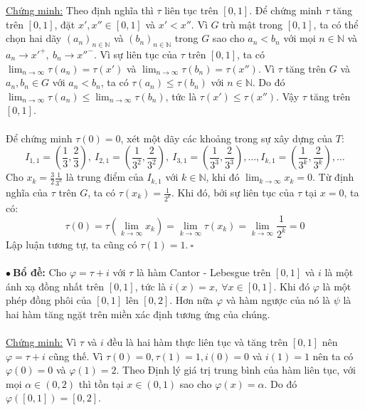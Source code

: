 \documentclass[10.5pt, a4paper]{article}
\begin{document}
\underline{Chứng minh:} Theo định nghĩa thì $\tau$ liên tục trên $[0,1]$. Để chứng minh $\tau$ tăng trên $[0,1]$, đặt $x',x''\in[0,1]$ và $x'<x''$. Vì $G$ trù mật trong $[0,1]$, ta có thể chọn hai dãy $(a_n)_{n\in\mathbb N}$ và $(b_n)_{n\in\mathbb N}$ trong $G$ sao cho $a_n<b_n$ với mọi $n\in\mathbb N$ và $a_n\rightarrow x'^+,~b_n\rightarrow x''^-$. Vì sự liên tục của $\tau$ trên $[0,1]$, ta có $\displaystyle\lim_{n\rightarrow\infty}\tau(a_n)=\tau(x')$ và $\displaystyle\lim_{n\rightarrow\infty}\tau(b_n)=\tau(x'')$. Vì $\tau$ tăng trên $G$ và $a_n,b_n\in G$ với $a_n<b_n$, ta có $\tau(a_n)\le\tau(b_n)$ với $n\in\mathbb N$. Do đó $\displaystyle\lim_{n\rightarrow\infty}\tau(a_n)\le\displaystyle\lim_{n\rightarrow\infty}\tau(b_n)$, tức là $\tau(x')\le\tau(x'')$. Vậy $\tau$ tăng trên $[0,1]$.\\\\
Để chứng minh $\tau(0)=0$, xét một dãy các khoảng trong sự xây dựng của $T:$ $$I_{1,1}=\left(\dfrac13,\dfrac23\right),~I_{2,1}=\left(\dfrac{1}{3^2},\dfrac{2}{3^2}\right),~I_{3,1}=\left(\dfrac{1}{3^3},\dfrac{2}{3^3}\right),\ldots,I_{k,1}=\left(\dfrac{1}{3^k},\dfrac{2}{3^k}\right),\ldots$$
Cho $x_k=\frac32\frac{1}{3^k}$ là trung điểm của $I_{k,1}$ với $k\in\mathbb N$, khi đó $\displaystyle\lim_{k\rightarrow\infty}x_k=0$. Từ định nghĩa của $\tau$ trên $G$, ta có $\tau(x_k)=\frac{1}{2^k}$. Khi đó, bởi sự liên tục của $\tau$ tại $x=0$, ta có: $$\tau(0)=\tau\left(\displaystyle\lim_{k\rightarrow\infty}x_k\right)=\displaystyle\lim_{k\rightarrow\infty}\tau(x_k)=\displaystyle\lim_{k\rightarrow\infty}\dfrac{1}{2^k}=0$$
Lập luận tương tự, ta cũng có $\tau(1)=1.~\square$\\\\
$\bullet~$\textbf{Bổ đề:} Cho $\varphi=\tau+i$ với $\tau$ là hàm Cantor - Lebesgue trên $[0,1]$ và $i$ là một ánh xạ đồng nhất trên $[0,1]$, tức là $i(x)=x,~\forall x\in[0,1]$. Khi đó $\varphi$ là một phép đồng phôi của $[0,1]$ lên $[0,2]$. Hơn nữa $\varphi$ và hàm ngược của nó là $\psi$ là hai hàm tăng ngặt trên miền xác định tương ứng của chúng.\\\\
\underline{Chứng minh:} Vì $\tau$ và $i$ đều là hai hàm thực liên tục và tăng trên $[0,1]$ nên $\varphi=\tau+i$ cũng thế. Vì $\tau(0)=0,\tau(1)=1,i(0)=0$ và $i(1)=1$ nên ta có $\varphi(0)=0$ và $\varphi(1)=2$. Theo Định lý giá trị trung bình của hàm liên tục, với mọi $\alpha\in(0,2)$ thì tồn tại $x\in(0,1)$ sao cho $\varphi(x)=\alpha$. Do đó $\varphi([0,1])=[0,2]$.\\\\
\end{document}
